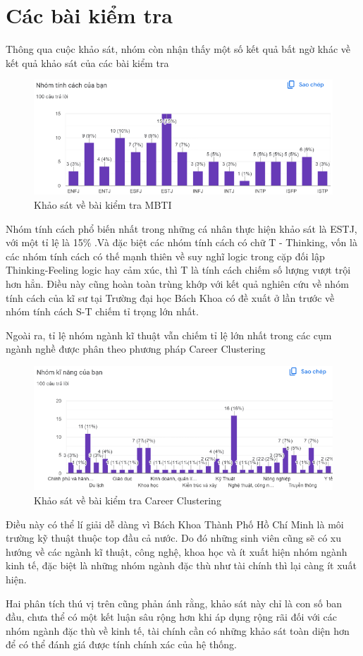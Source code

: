 \section{Các bài kiểm tra}
Thông qua cuộc khảo sát, nhóm còn nhận thấy một số kết quả bất ngờ khác về kết quả khảo sát của các bài kiểm tra

\begin{figure}[H]
    \centering
    \includegraphics[width=0.8\linewidth]{images/survey2.png}    \vspace{0.6cm}
    \caption{Khảo sát về bài kiểm tra MBTI}
\end{figure}

Nhóm tính cách phổ biến nhất trong những cá nhân thực hiện khảo sát là ESTJ, với một tỉ lệ là 15\% .Và đặc biệt các nhóm tính cách có chữ T - Thinking, vốn là các nhóm tính cách có thế mạnh thiên về suy nghĩ logic trong cặp đối lập Thinking-Feeling logic hay cảm xúc, thì T là tính cách chiếm số lượng vượt trội hơn hẳn. Điều này cũng hoàn toàn trùng khớp với kết quả nghiên cứu về nhóm tính cách của kĩ sư tại Trường đại học Bách Khoa có đề xuất ở lần trước về nhóm tính cách S-T chiếm tỉ trọng lớn nhất.

Ngoài ra, tỉ lệ nhóm ngành kĩ thuật vẫn chiếm tỉ lệ lớn nhất trong các cụm ngành nghề được phân theo phương pháp Career Clustering

\begin{figure}[H]
    \centering
    \includegraphics[width=0.8\linewidth]{images/survey3.png}    \vspace{0.6cm}
    \caption{Khảo sát về bài kiểm tra Career Clustering}
\end{figure}

Điều này có thể lí giải dễ dàng vì Bách Khoa Thành Phố Hồ Chí Minh là môi trường kỹ thuật thuộc top đầu cả nước. Do đó những sinh viên cũng sẽ có xu hướng về các ngành kĩ thuật, công nghệ, khoa học và ít xuất hiện nhóm ngành kinh tế, đặc biệt là những nhóm ngành đặc thù như tài chính thì lại càng ít xuất hiện.

Hai phân tích thú vị trên cũng phản ánh rằng, khảo sát này chỉ là con số ban đầu, chưa thể có một kết luận sâu rộng hơn khi áp dụng rộng rãi đối với các nhóm ngành đặc thù về kinh tế, tài chính cần có những khảo sát toàn diện hơn để có thể đánh giá được tính chính xác của hệ thống.
